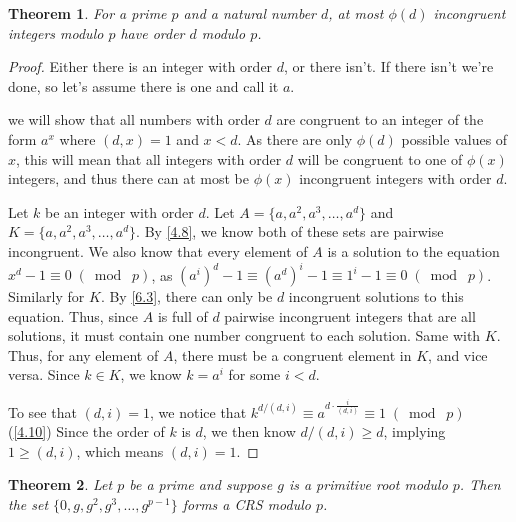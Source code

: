 \documentclass{article}
\newtheorem{thm}{Theorem}[section]
\numberwithin{equation}{thm}
\providecommand{\gmod}[1]{\; (\bmod \; #1)}
\begin{document}
\pagebreak



\begin{thm} \label{6.5}
  For a prime $p$ and a natural number $d$, at most $\phi (d)$ incongruent integers modulo $p$ have order $d$ modulo $p$.
\end{thm}

\begin{proof}
  Either there is an integer with order $d$, or there isn't. If there isn't we're done, so let's assume there is one and call it $a$.

  we will show that all numbers with order $d$ are congruent to an integer of the form $a^x$ where $(d, x) = 1$ and $x < d$. As there are only $\phi(d)$ possible values of $x$, this will mean that all integers with order $d$ will be congruent to one of $\phi(x)$ integers, and thus there can at most be $\phi(x)$ incongruent integers with order $d$.

  Let $k$ be an integer with order $d$. Let $A = \{a, a^2, a^3, \ldots, a^d\}$ and $K = \{a, a^2, a^3, \ldots, a^d\}$. By \ref{4.8}, we know both of these sets are pairwise incongruent. We also know that every element of $A$ is a solution to the equation $x^d - 1 \equiv 0 \gmod p$, as $(a^i)^d - 1 \equiv (a^d)^i - 1 \equiv 1^i - 1 \equiv 0 \gmod p$. Similarly for $K$.
  By \ref{6.3}, there can only be $d$ incongruent solutions to this equation. Thus, since $A$ is full of $d$ pairwise incongruent integers that are all solutions, it must contain one number congruent to each solution. Same with $K$. Thus, for any element of $A$, there must be a congruent element in $K$, and vice versa. Since $k \in K$, we know $k = a^i$ for some $i < d$.

  To see that $(d, i) = 1$, we notice that $k^{d/(d,i)} \equiv a^{d \cdot \frac{i}{(d,i)}} \equiv 1 \gmod p$ (\ref{4.10}) Since the order of $k$ is $d$, we then know $d/(d,i) \geq d$, implying $1 \geq (d,i)$, which means $(d,i) = 1$.
\end{proof}



\begin{thm} \label{6.6}
  Let $p$ be a prime and suppose $g$ is a primitive root modulo $p$. Then the set $\{0, g, g^2, g^3, \ldots, g^{p-1}\}$ forms a CRS modulo $p$.
\end{thm}
\end{document}
